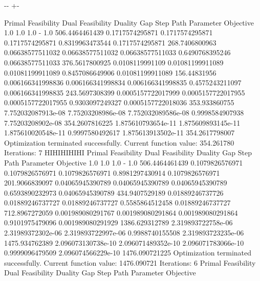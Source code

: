 \documentclass[letterpaper,10pt,english]{sphinxmanual}
\newlength\nbsphinxcodecellspacing
\begin{document}
{

\kern-\sphinxverbatimsmallskipamount\kern-\baselineskip
\kern+\FrameHeightAdjust\kern-\fboxrule
\vspace{\nbsphinxcodecellspacing}

\begin{sphinxVerbatim}[commandchars=\\\{\}]
Primal Feasibility  Dual Feasibility    Duality Gap         Step             Path Parameter      Objective
1.0                 1.0                 1.0                 -                1.0                 506.4464461439
0.1717574295871     0.1717574295871     0.1717574295871     0.8319963473544  0.1717574295871     268.7406800963
0.06638577511032    0.06638577511032    0.06638577511033    0.6490768395246  0.06638577511033    376.5617800925
0.0108119991109     0.01081199911089    0.01081199911089    0.8457086649906  0.01081199911089    156.44831956
0.006166341998836   0.006166341998834   0.006166341998835   0.4575243211097  0.006166341998835   243.5697308399
0.0005157722017999  0.0005157722017955  0.0005157722017955  0.9303097249327  0.0005157722018036  353.933860755
7.752032087913e-08  7.75203208986e-08   7.752032089586e-08  0.9998584907938  7.75203208902e-08   354.2607816225
1.875610793654e-11  1.875609893145e-11  1.875610020548e-11  0.9997580492617  1.875613913502e-11  354.2617798007
Optimization terminated successfully.
         Current function value: 354.261780
         Iterations: 7
HIHIHIHIHI
Primal Feasibility  Dual Feasibility    Duality Gap         Step             Path Parameter      Objective
1.0                 1.0                 1.0                 -                1.0                 506.4464461439
0.1079826576971     0.1079826576971     0.1079826576971     0.8981297430914  0.1079826576971     201.9066839097
0.04065945390789    0.04065945390789    0.04065945390789    0.6593890232973  0.04065945390789    434.9407529189
0.01889246737726    0.01889246737727    0.01889246737727    0.5585864512458  0.01889246737727    712.8967272059
0.001989080291767   0.001989080291864   0.001989080291864   0.9101975479096  0.001989080291929   1386.629312789
2.319893722758e-06  2.31989372302e-06   2.319893722997e-06  0.9988740155508  2.319893723235e-06  1475.934762389
2.096073130738e-10  2.096071489352e-10  2.096071783066e-10  0.9999096479509  2.096074566229e-10  1476.090721225
Optimization terminated successfully.
         Current function value: 1476.090721
         Iterations: 6
Primal Feasibility  Dual Feasibility    Duality Gap         Step             Path Parameter      Objective

\end{sphinxVerbatim}}
\end{document}
